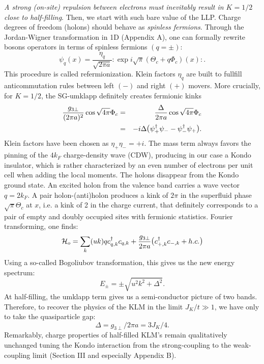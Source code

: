 \emph{A strong (on-site) repulsion between electrons must inevitably result
in $K=1/2$ close to half-filling}\cite{Schulz3,Anderson-Ren}. Then, we 
start with such bare value of the LLP.
Charge degrees of freedom (holons) should behave as
\emph{spinless fermions}\cite{remark0}. Through the Jordan-Wigner transformation in 1D (Appendix A), 
one can formally rewrite bosons operators in terms of spinless fermions 
$(q=\pm)$\cite{Haldane,Schulz1}:
\begin{equation}
\label{sept}
\psi_{q}(x)=\frac{\eta_q}{\sqrt{2\pi a}}:\exp
i \sqrt{\pi}(\Theta_c+q\Phi_c)(x):.
\end{equation}
This procedure is called refermionization.
Klein factors $\eta_q$ are built to fullfill anticommutation
rules between left $(-)$ and right $(+)$ movers.
More crucially, for $K=1/2$, the SG-umklapp definitely creates
fermionic kinks\cite{Schulz2}
\begin{eqnarray}
\label{mass}
\frac{g_{3\perp}}{(2\pi a)^2}\cos\sqrt{4\pi}\Phi_c &=& \frac{\Delta}{2\pi a}
\cos\sqrt{4\pi}\Phi_c \\ \nonumber
&=& -
i\Delta \hbox{\large(}
\psi_{+}^{\dag}\psi_{-}-\psi_{-}^{\dag}\psi_{+}\hbox{\large)}.
\end{eqnarray}
Klein factors have been chosen as $\eta_+\eta_-=+i$.
The mass term 
always favors the pinning of the $4k_F$ charge-density wave (CDW), producing in
our case a Kondo insulator, which is rather characterized by an even number
of electrons per unit cell when adding the local
moments. The holons 
disappear from the Kondo ground state. An excited holon from the valence 
band carries 
a wave vector $q=2k_F$. A pair holon-(anti)holon\cite{remark2} 
produces a kink of $2\pi$ in the
superfluid phase $\sqrt{\pi}\Theta_c$ at $x$, i.e. a kink of 2
in the charge current, that definitely
corresponds to a pair of empty and doubly occupied sites with fermionic
statistics. Fourier transforming, one finds:
\begin{equation}
\label{un}
{\cal H}_o =\sum_k (uk) qc^{\dag}_{q,k}c_{q,k}
+\frac{g_{3\perp}}{2\pi a}
\hbox{\large(}c^{\dag}_{+,k}c_{-,k}+h.c.\hbox{\large)}
\end{equation}
Using a so-called Bogoliubov transformation, this gives 
us the new energy spectrum:
\begin{equation}
E_{\pm}=\pm \sqrt{{u}^2k^2+{\Delta}^2}.
\end{equation}
At half-filling, the umklapp term gives us a semi-conductor picture of two
bands. Therefore, to recover the physics of the KLM in the limit 
$J_K/t\gg 1$, we have only to take the quasiparticle gap\cite{Ueda_review}:
\begin{equation} 
\Delta=g_{3\perp}/2\pi a=3 J_K/4. 
\end{equation}
Remarkably, charge properties of
half-filled KLM's remain qualitatively unchanged
tuning the Kondo interaction from the strong-coupling to the weak-coupling
limit (Section III and especially Appendix B).

